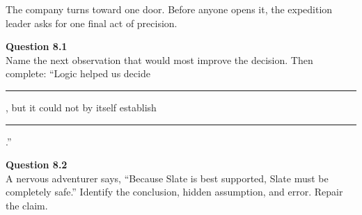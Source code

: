 \documentclass[12pt]{article}
\begin{document}
The company turns toward one door. Before anyone opens it, the expedition leader asks for one final act of precision.

\textbf{Question 8.1}\\[-0.15em]
Name the next observation that would most improve the decision. Then complete: ``Logic helped us decide \rule{1.6in}{0.4pt}, but it could not by itself establish \rule{1.6in}{0.4pt}.''


\textbf{Question 8.2}\\[-0.15em]
A nervous adventurer says, ``Because Slate is best supported, Slate must be completely safe.'' Identify the conclusion, hidden assumption, and error. Repair the claim.

\end{document}
